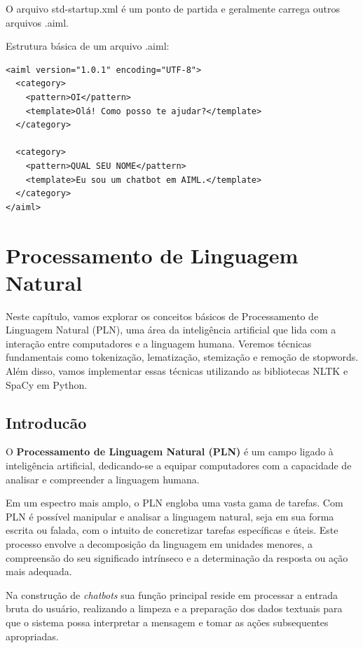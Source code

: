 \documentclass[14pt,a4paper,oneside]{book}
\begin{document}
O arquivo std-startup.xml é um ponto de partida e geralmente carrega outros arquivos .aiml.

Estrutura básica de um arquivo .aiml:

\begin{lstlisting}
<aiml version="1.0.1" encoding="UTF-8">
  <category>
    <pattern>OI</pattern>
    <template>Olá! Como posso te ajudar?</template>
  </category>
  
  <category>
    <pattern>QUAL SEU NOME</pattern>
    <template>Eu sou um chatbot em AIML.</template>
  </category>
</aiml>
\end{lstlisting}


\chapter{Processamento de Linguagem Natural}

Neste capítulo, vamos explorar os conceitos básicos de Processamento de Linguagem Natural (PLN), uma área da inteligência artificial que lida com a interação entre computadores e a linguagem humana. Veremos técnicas fundamentais como tokenização, lematização, stemização e remoção de stopwords. Além disso, vamos implementar essas técnicas utilizando as bibliotecas NLTK e SpaCy em Python.

\section{Introducão}

O \textbf{Processamento de Linguagem Natural (PLN)} é um campo  ligado à inteligência artificial, dedicando-se a equipar computadores com a capacidade de analisar e compreender a linguagem humana. 

Em um espectro mais amplo, o PLN engloba uma vasta gama de tarefas. Com PLN é possível manipular e analisar a linguagem natural, seja em sua forma escrita ou falada, com o intuito de concretizar tarefas específicas e úteis. Este processo envolve a decomposição da linguagem em unidades menores, a compreensão do seu significado intrínseco e a determinação da resposta ou ação mais adequada.

Na construção de \textit{chatbots} sua função principal reside em processar a entrada bruta do usuário, realizando a limpeza e a preparação dos dados textuais para que o sistema possa interpretar a mensagem e tomar as ações subsequentes apropriadas.
\end{document}
